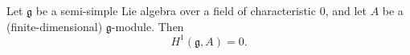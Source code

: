Let $\mathfrak{g}$ be a semi-simple Lie algebra over a field of characteristic $0$, and let $A$ be a (finite-dimensional) $\mathfrak{g}$-module. Then
$$H^1(\mathfrak{g}, A) = 0.$$
